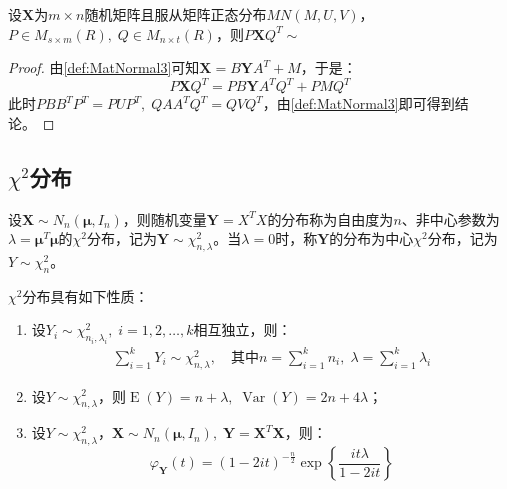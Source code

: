 \begin{theorem}\label{theo:MatNormalLinearTransform}
	设$\mathbf{X}$为$m\times n$随机矩阵且服从矩阵正态分布$MN(M,U,V)$，$P\in M_{s\times m}(R),\;Q\in M_{n\times t}(R)$，则$P\mathbf{X}Q^T\sim$
\end{theorem}
\begin{proof}
	由\cref{def:MatNormal3}可知$\mathbf{X}=B\mathbf{Y}A^T+M$，于是：
	\begin{equation*}
		P\mathbf{X}Q^T=PB\mathbf{Y}A^TQ^T+PMQ^T
	\end{equation*}
	此时$PBB^TP^T=PUP^T,\;QAA^TQ^T=QVQ^T$，由\cref{def:MatNormal3}即可得到结论。
\end{proof}

\subsection{$\chi^2$分布}
\begin{definition}
	设$\mathbf{X}\sim N_n(\boldsymbol{\mu}, I_n)$，则随机变量$\mathbf{Y}=X^TX$的分布称为自由度为$n$、非中心参数为$\lambda=\boldsymbol{\mu}^T\boldsymbol{\mu}$的$\chi^2$分布，记为$\mathbf{Y}\sim \chi^2_{n,\lambda}$。当$\lambda=0$时，称$\mathbf{Y}$的分布为中心$\chi^2$分布，记为$Y\sim\chi_n^2$。
\end{definition}
\begin{property}\label{prop:Chi2Distribution}
	$\chi^2$分布具有如下性质：
	\begin{enumerate}
		\item 设$Y_i\sim\chi_{n_i,\lambda_i}^2,\;i=1,2,\dots,k$相互独立，则：
		\begin{gather*}
			\sum_{i=1}^{k}Y_i\sim\chi_{n,\lambda}^2,\quad\text{其中}
			n=\sum_{i=1}^{k}n_i,\;\lambda=\sum_{i=1}^{k}\lambda_i
		\end{gather*}
		\item 设$Y\sim\chi_{n,\lambda}^2$，则$\operatorname{E}(Y)=n+\lambda,\;\operatorname{Var}(Y)=2n+4\lambda$；
		\item 设$Y\sim\chi_{n,\lambda}^2$，$\mathbf{X}\sim N_n(\boldsymbol{\mu},I_n),\;\mathbf{Y}=\mathbf{X}^T\mathbf{X}$，则：
		\begin{equation*}
			\varphi_{\mathbf{Y}}(t)=(1-2it)^{-\frac{n}{2}}\exp\left\{\frac{it\lambda}{1-2it}\right\}
		\end{equation*}
	\end{enumerate}
\end{property}
